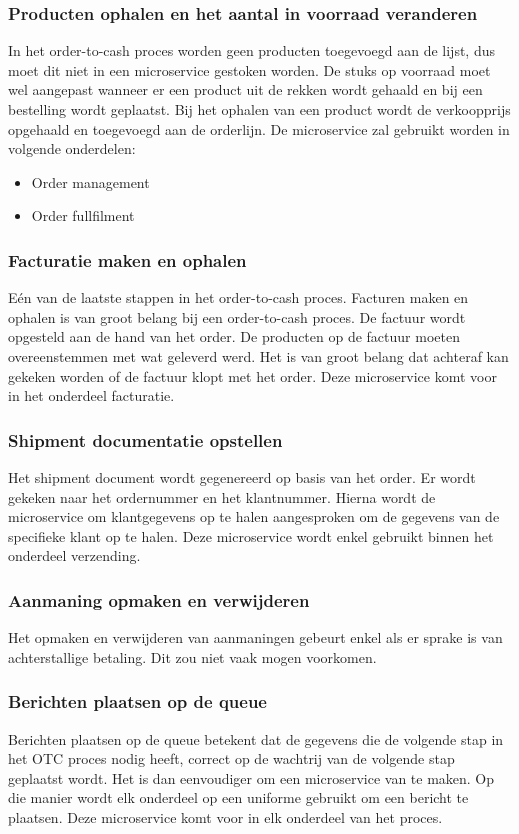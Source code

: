 \subsubsection{Producten ophalen en het aantal in voorraad veranderen}
In het order-to-cash proces worden geen producten toegevoegd aan de lijst, dus moet dit niet in een microservice gestoken worden. De stuks op voorraad moet wel aangepast wanneer er een product uit de rekken wordt gehaald en bij een bestelling wordt geplaatst. Bij het ophalen van een product wordt de verkoopprijs opgehaald en toegevoegd aan de orderlijn.
De microservice zal gebruikt worden in volgende onderdelen:
\begin{itemize}
	\item Order management
	\item Order fullfilment
\end{itemize}

\subsubsection{Facturatie maken en ophalen}
Eén van de laatste stappen in het order-to-cash proces. Facturen maken en ophalen is van groot belang bij een order-to-cash proces. De factuur wordt opgesteld aan de hand van het order.  De producten op de factuur moeten overeenstemmen met wat geleverd werd. Het is van groot belang dat achteraf kan gekeken worden of de factuur klopt met het order.
Deze microservice komt voor in het onderdeel facturatie.

\subsubsection{Shipment documentatie opstellen}
Het shipment document wordt gegenereerd op basis van het order. Er wordt gekeken naar het ordernummer en het klantnummer. Hierna wordt de microservice om klantgegevens op te halen aangesproken om de gegevens van de specifieke klant op te halen. Deze microservice wordt enkel gebruikt binnen het onderdeel verzending.

\subsubsection{Aanmaning opmaken en verwijderen}
Het opmaken en verwijderen van aanmaningen gebeurt enkel als er sprake is van achterstallige betaling. Dit zou niet vaak mogen voorkomen. 

\subsubsection{Berichten plaatsen op de queue}
Berichten plaatsen op de queue betekent dat de gegevens die de volgende stap in het OTC proces nodig heeft, correct op de wachtrij van de volgende stap geplaatst wordt.  Het is dan eenvoudiger om een microservice van te maken. Op die manier wordt elk onderdeel op een uniforme gebruikt om een bericht te plaatsen. 
Deze microservice komt voor in elk onderdeel van het proces.

